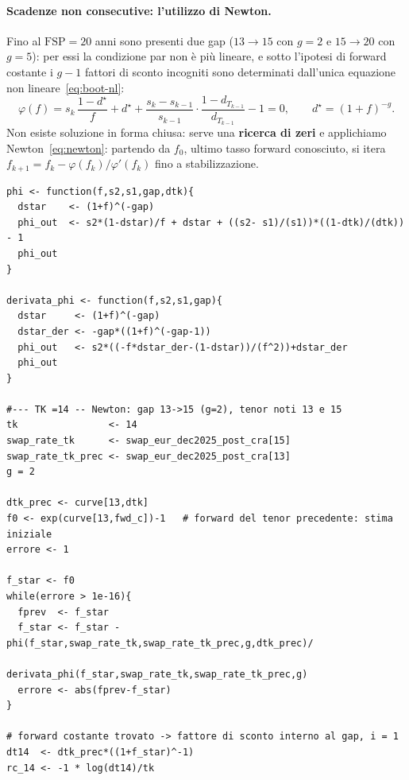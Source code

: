 \documentclass[11pt,a4paper]{article}
\theoremstyle{plain}
\theoremstyle{definition}
\theoremstyle{remark}
\newcommand{\FSP}{\mathrm{FSP}}
\begin{document}
\paragraph{Scadenze non consecutive: l'utilizzo di Newton.}
\label{sec:newton-esempio}

Fino al $\FSP = 20$ anni sono presenti due gap ($13\!\to\!15$ con $g=2$ e $15\!\to\!20$ con
$g=5$): per essi la condizione par non \`e pi\`u lineare, e sotto l'ipotesi di forward
costante i $g-1$ fattori di sconto incogniti sono determinati dall'unica equazione non
lineare~\eqref{eq:boot-nl}:
\[
  \varphi(f) = s_{k}\,\frac{1 - d^\star}{f} + d^\star
             + \frac{s_{k} - s_{k-1}}{s_{k-1}}\cdot\frac{1 - d_{T_{k-1}}}{d_{T_{k-1}}} - 1 = 0,
  \qquad d^\star = (1+f)^{-g}.
\]
Non esiste soluzione in forma chiusa: serve una \textbf{ricerca di zeri} e applichiamo Newton~\eqref{eq:newton}:
partendo da $f_0$, ultimo tasso forward conosciuto, si itera
$f_{k+1} = f_k - \varphi(f_k)/\varphi'(f_k)$ fino a stabilizzazione.

\begin{codebox}
\begin{Verbatim}[fontsize=\small]
phi <- function(f,s2,s1,gap,dtk){
  dstar    <- (1+f)^(-gap)
  phi_out  <- s2*(1-dstar)/f + dstar + ((s2- s1)/(s1))*((1-dtk)/(dtk)) - 1
  phi_out
}

derivata_phi <- function(f,s2,s1,gap){
  dstar     <- (1+f)^(-gap)
  dstar_der <- -gap*((1+f)^(-gap-1))
  phi_out   <- s2*((-f*dstar_der-(1-dstar))/(f^2))+dstar_der
  phi_out
}

#--- TK =14 -- Newton: gap 13->15 (g=2), tenor noti 13 e 15
tk                <- 14
swap_rate_tk      <- swap_eur_dec2025_post_cra[15]
swap_rate_tk_prec <- swap_eur_dec2025_post_cra[13]
g = 2

dtk_prec <- curve[13,dtk]
f0 <- exp(curve[13,fwd_c])-1   # forward del tenor precedente: stima iniziale
errore <- 1

f_star <- f0
while(errore > 1e-16){
  fprev  <- f_star
  f_star <- f_star - phi(f_star,swap_rate_tk,swap_rate_tk_prec,g,dtk_prec)/
                     derivata_phi(f_star,swap_rate_tk,swap_rate_tk_prec,g)
  errore <- abs(fprev-f_star)
}

# forward costante trovato -> fattore di sconto interno al gap, i = 1
dt14  <- dtk_prec*((1+f_star)^-1)
rc_14 <- -1 * log(dt14)/tk
\end{Verbatim}
\end{codebox}
\end{document}
